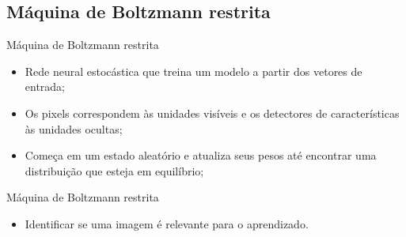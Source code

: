 \documentclass{beamer}
\begin{document}
\subsection{Máquina de Boltzmann restrita}
\begin{frame}{Máquina de Boltzmann restrita}
\begin{itemize}
  \item Rede neural estocástica que treina um modelo a partir dos vetores de entrada;
  \item Os pixels correspondem às unidades visíveis e os detectores de características às unidades ocultas;
  \item Começa em um estado aleatório e atualiza seus pesos até encontrar uma distribuição que esteja em equilíbrio;
\end{itemize}

\end{frame}

\begin{frame}{Máquina de Boltzmann restrita}
\begin{itemize}
  \item Identificar se uma imagem é relevante para o aprendizado.
\end{itemize}

\end{frame}

\end{document}
